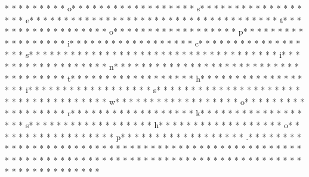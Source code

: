  *  * * *  *  * * *  * o* * *  * * *  * * *  *  * * *  *  * * *  * s* * *  * * *  * * *  *  * * *  *  * * *  * e* * *  * * *  * * *  *  * * *  *  * * *  *  * * *  * * *  * * *  *  * * *  *  * * *  * t* * *  * * *  * * *  *  * * *  *  * * *  * o* * *  * * *  * * *  *  * * *  *  * * *  * p* * *  * * *  * * *  *  * * *  *  * * *  * i* * *  * * *  * * *  *  * * *  *  * * *  * c* * *  * * *  * * *  *  * * *  *  * * *  * s* * *  * * *  * * *  *  * * *  *  * * *  *  * * *  * * *  * * *  *  * * *  *  * * *  * i* * *  * * *  * * *  *  * * *  *  * * *  * n* * *  * * *  * * *  *  * * *  *  * * *  *  * * *  * * *  * * *  *  * * *  *  * * *  * t* * *  * * *  * * *  *  * * *  *  * * *  * h* * *  * * *  * * *  *  * * *  *  * * *  * i* * *  * * *  * * *  *  * * *  *  * * *  * s* * *  * * *  * * *  *  * * *  *  * * *  *  * * *  * * *  * * *  *  * * *  *  * * *  * w* * *  * * *  * * *  *  * * *  *  * * *  * o* * *  * * *  * * *  *  * * *  *  * * *  * r* * *  * * *  * * *  *  * * *  *  * * *  * k* * *  * * *  * * *  *  * * *  *  * * *  * s* * *  * * *  * * *  *  * * *  *  * * *  * h* * *  * * *  * * *  *  * * *  *  * * *  * o* * *  * * *  * * *  *  * * *  *  * * *  * p* * *  * * *  * * *  *  * * *  *  * * *  * .* * *  * * *  * * *  *  * * *  *  * * *  * 
* * *  * * *  * * *  *  * * *  *  * * *  * 	* * *  * * *  * * *  *  * * *  *  * * *  * 
* * *  * * *  * * *  *  * * *  *  * * *  * 
* * *  * * *  * * *  *  * * *  *  * * *  * 
* * *  * * *  * * *  *  * * *  *  * * *  * 
